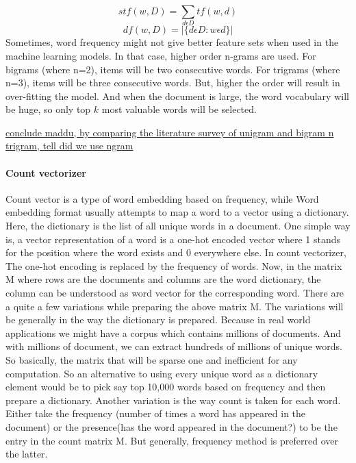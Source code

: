 \begin{equation}
\label{eqn:3}
stf(w,D) = \sum_{d \epsilon D} tf(w,d)
\end{equation}
\begin{equation}
\label{eqn:4}
df(w,D) = |\{d \epsilon D: w \epsilon d \}|
\end{equation}
Sometimes, word frequency might not give better feature sets when used in the machine learning models. In that case, higher order n-grams are used. For bigrams (where n=2), items will be two consecutive words. For trigrams (where n=3), items will be three consecutive words. But, higher the order will result in over-fitting the model. And when the document is large, the word vocabulary will be huge, so only top $k$ most valuable words will be selected.

\underline{conclude maddu, by comparing the literature survey of unigram and bigram n trigram, tell did we use ngram}

\paragraph{Count vectorizer}
Count vector is a type of word embedding based on frequency, while Word embedding format usually attempts to map a word to a vector using a dictionary. Here, the dictionary is the list of all unique words in a document. One simple way is, a vector representation of a word is a one-hot encoded vector where 1 stands for the position where the word exists and 0 everywhere else. In count vectorizer, The one-hot encoding is replaced by the frequency of words. Now, in the matrix M where rows are the documents and columns are the word dictionary, the column can be understood as word vector for the corresponding word. There are a quite a few variations while preparing the above matrix M. The variations will be generally in the way the dictionary is prepared.
Because in real world applications we might have a corpus which contains millions of documents. And with millions of document, we can extract hundreds of millions of unique words. So basically, the matrix that will be sparse one and inefficient for any computation. So an alternative to using every unique word as a dictionary element would be to pick say top 10,000 words based on frequency and then prepare a dictionary. Another variation is the way count is taken for each word. Either take the frequency (number of times a word has appeared in the document) or the presence(has the word appeared in the document?) to be the entry in the count matrix M. But generally, frequency method is preferred over the latter.

